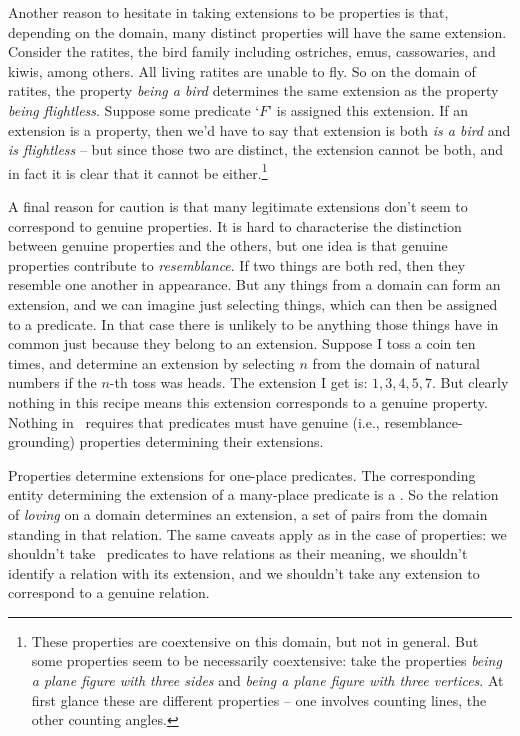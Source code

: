 \begin{earg}
Another reason to hesitate in taking extensions to be properties is that, depending on the domain, many distinct properties will have the same extension. Consider the ratites, the bird family including ostriches, emus, cassowaries, and kiwis, among others. All living ratites are unable to fly. So on the domain of ratites, the property \emph{being a bird} determines the same extension as the property \emph{being flightless}. Suppose some predicate `$F$' is assigned this extension. If an extension is a property, then we'd have to say that extension is both \emph{is a bird} and \emph{is flightless} – but since those two are distinct, the extension cannot be both, and in fact it is clear that it cannot be either.\footnote{These properties are coextensive on this domain, but not in general. But some properties seem to be necessarily coextensive: take the properties \emph{being a plane figure with three sides} and \emph{being a plane figure with three vertices}. At first glance these are different properties – one involves counting lines, the other counting angles.}

A final reason for caution is that many legitimate extensions don't seem to correspond to genuine properties. It is hard to characterise the distinction between genuine properties and the others, but one idea is that genuine properties contribute to \emph{resemblance}. If two things are both red, then they resemble one another in appearance. But any things from a domain can form an extension, and we can imagine just selecting things, which can then be assigned to a predicate. In that case there is unlikely to be anything those things have in common just because they belong to an extension. Suppose I toss a coin ten times, and determine an extension by selecting $n$ from the domain of natural numbers if the $n$-th toss was heads. The extension I get is: $1, 3, 4, 5, 7$. But clearly nothing in this recipe means this extension corresponds to a genuine property. Nothing in \FOL\ requires that predicates must have genuine (i.e., resemblance-grounding) properties determining their extensions.  

Properties determine extensions for one-place predicates. The corresponding entity determining the extension of a many-place predicate is a . So the relation of \emph{loving} on a domain determines an extension, a set of pairs from the domain standing in that relation. The same caveats apply as in the case of properties: we shouldn't take \FOL\ predicates to have relations as their meaning, we shouldn't identify a relation with its extension, and we shouldn't take any extension to correspond to a genuine relation.


\end{earg}
